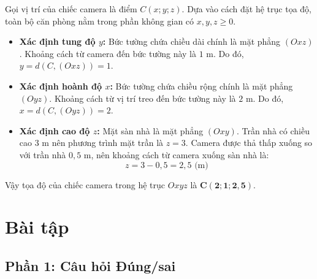 \documentclass[12pt]{article}
\begin{document}
	\begin{loigiai}
		Gọi vị trí của chiếc camera là điểm $C(x; y; z)$. Dựa vào cách đặt hệ trục tọa độ, toàn bộ căn phòng nằm trong phần không gian có $x, y, z \ge 0$.
		\begin{itemize}
			\item \textbf{Xác định tung độ $y$:} Bức tường chứa chiều dài chính là mặt phẳng $(Oxz)$. Khoảng cách từ camera đến bức tường này là $1\text{ m}$. Do đó, $y = d(C, (Oxz)) = 1$.
			\item \textbf{Xác định hoành độ $x$:} Bức tường chứa chiều rộng chính là mặt phẳng $(Oyz)$. Khoảng cách từ vị trí treo đến bức tường này là $2\text{ m}$. Do đó, $x = d(C, (Oyz)) = 2$.
			\item \textbf{Xác định cao độ $z$:} Mặt sàn nhà là mặt phẳng $(Oxy)$. Trần nhà có chiều cao $3\text{ m}$ nên phương trình mặt trần là $z = 3$. Camera được thả thấp xuống so với trần nhà $0,5\text{ m}$, nên khoảng cách từ camera xuống sàn nhà là:
			\[ z = 3 - 0,5 = 2,5 \text{ (m)} \]
		\end{itemize}
		Vậy tọa độ của chiếc camera trong hệ trục $Oxyz$ là $\mathbf{C(2; 1; 2,5)}$.
	\end{loigiai}
	
	
	\section{Bài tập}
	\subsection{Phần 1: Câu hỏi Đúng/sai}
	
\end{document}
